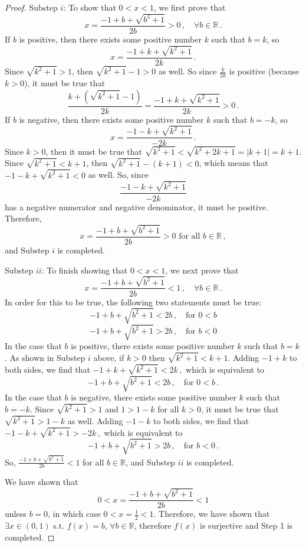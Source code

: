 \documentclass[10pt,letterpaper]{article}
\newcommand{\R}{\mathbb{R}}
\begin{document}
\begin{proof}
Substep $i$: To show that $0<x<1$, we first prove that 
$$x=\frac{-1+b+\sqrt{b^2+1}}{2b}>0\,,\quad\forall b \in \R\,.$$
If $b$ is positive, then there exists some positive number $k$ such that $b=k$, so 
$$x=\frac{-1+k+\sqrt{k^2+1}}{2k}\,.$$
Since $\sqrt{k^2+1}>1$, then $\sqrt{k^2+1}-1>0$ as well. So since $\frac{k}{2k}$ is positive (because $k>0$), it must be true that 
$$\frac{k+(\sqrt{k^2+1}-1)}{2k}=\frac{-1+k+\sqrt{k^2+1}}{2k}>0\,.$$
If $b$ is negative, then there exists some positive number $k$ such that $b=-k$, so 
$$x=\frac{-1-k+\sqrt{k^2+1}}{-2k}\,.$$
Since $k>0$, then it must be true that $\sqrt{k^2+1}<\sqrt{k^2+2k+1}=|k+1|=k+1$. Since $\sqrt{k^2+1}<k+1$, then $\sqrt{k^2+1}-(k+1)<0$, which means that $-1-k+\sqrt{k^2+1}<0$ as well. So, since
$$\frac{-1-k+\sqrt{k^2+1}}{-2k}$$
has a negative numerator and negative denominator, it must be positive. Therefore, 
$$x=\frac{-1+b+\sqrt{b^2+1}}{2b}>0\text{ for all }b \in \R\,,$$
and Substep $i$ is completed.  

Substep $ii$: To finish showing that $0<x<1$, we next prove that 
$$x=\frac{-1+b+\sqrt{b^2+1}}{2b}<1\,,\quad\forall b \in \R\,.$$
In order for this to be true, the following two statements must be true:
$$-1+b+\sqrt{b^2+1}<2b\,,\quad \text{for } 0<b$$
$$-1+b+\sqrt{b^2+1}>2b\,,\quad \text{for } b<0$$
In the case that $b$ is positive, there exists some positive number $k$ such that $b=k$. As shown in Substep $i$ above, if $k>0$ then $\sqrt{k^2+1}<k+1$. Adding $-1+k$ to both sides, we find that 
$-1+k+\sqrt{k^2+1}<2k\,,$
which is equivalent to 
$$-1+b+\sqrt{b^2+1}<2b\,,\quad \text{for } 0<b\,.$$
In the case that $b$ is negative, there exists some positive number $k$ such that $b=-k$. Since $\sqrt{k^2+1}>1$ and $1>1-k$ for all $k>0$, it must be true that $\sqrt{k^2+1}>1-k$ as well. Adding $-1-k$ to both sides, we find that 
$-1-k+\sqrt{k^2+1}>-2k\,,$
which is equivalent to 
$$-1+b+\sqrt{b^2+1}>2b\,,\quad \text{for } b<0\,.$$
So, $\frac{-1+b+\sqrt{b^2+1}}{2b}<1$ for all $b \in \R$, and Substep $ii$ is completed.  

We have shown that 
$$0<x=\frac{-1+b+\sqrt{b^2+1}}{2b}<1$$
unless $b=0$, in which case $0<x=\frac{1}{2}<1$. Therefore, we have shown that $\exists x \in (0,1)$ s.t. $f(x)=b$, $ \forall b \in \R$, therefore $f(x)$ is surjective and Step 1 is completed.


\end{proof}
\end{document}
